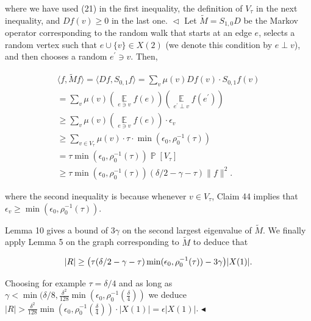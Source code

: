 where we have used (21) in the first inequality, the definition of $V_{\tau}$ in the next inequality, and $Df(v)\geq 0$ in the last one.
$\vartriangleleft$
Let $\tilde{M}=S_{1,0}D$  be the Markov operator corresponding to the random walk that starts at an edge $e$, selects a random vertex such that $e\cup\{v\}\in X(2)$ (we denote this condition by $e\perp v$), and then chooses a random $e^{\prime}\ni v$.
Then,\par


\[\begin{gathered}
\displaystyle\langle f,\tilde{M}f\rangle=\langle Df,S_{0,1}f\rangle \displaystyle=\sum_{v}\mu(v)Df(v)\cdot S_{0,1}f(v) \\
\displaystyle=\sum_{v}\mu(v)(\operatorname*{\mathbb{E}}_{e\ni v}f(e))(\operatorname*{\mathbb{E}}_{e^{\prime}\perp v}f(e^{\prime})) \\
\displaystyle\geq\sum_{v}\mu(v)(\operatorname*{\mathbb{E}}_{e\ni v}f(e))\cdot\epsilon_{v} \\
\displaystyle\geq\sum_{v\in V_{\tau}}\mu(v)\cdot\tau\cdot\min(\epsilon_{0},\rho_{0}^{-1}(\tau)) \\
\displaystyle=\tau\min(\epsilon_{0},\rho_{0}^{-1}(\tau))\operatorname*{\mathbb{P}}[V_{\tau}] \\
\displaystyle\geq\tau\min(\epsilon_{0},\rho_{0}^{-1}(\tau))(\delta/2-\gamma-\tau)\lVert f\rVert^{2}.
\end{gathered}\]


where the second inequality is because whenever $v\in V_{\tau}$, Claim 44 implies that $\epsilon_{v}\geq\min(\epsilon_{0},\rho_{0}^{-1}(\tau))$.\par




Lemma 10 gives a bound of $3\gamma$ on the second largest eigenvalue of $\tilde{M}$. We finally apply Lemma 5 on the graph corresponding to $\tilde{M}$ to deduce that\par


\[\begin{gathered}
|R|\geq\big{(}\tau(\delta/2-\gamma-\tau)\min(\epsilon_{0},\rho_{0}^{-1}(\tau))-3\gamma\big{)}|X(1)|.
\end{gathered}\]


Choosing for example $\tau=\delta/4$ and as long as $\gamma<\min(\delta/8,\frac{\delta^{2}}{128}\min(\epsilon_{0},\rho_{0}^{-1}(\frac{\delta}{4}))$ we deduce $|R|>\frac{\delta^{2}}{128}\min(\epsilon_{0},\rho_{0}^{-1}(\frac{\delta}{4}))\cdot|X(1)|=\epsilon|X(1)|$.
$\blacktriangleleft$\par






